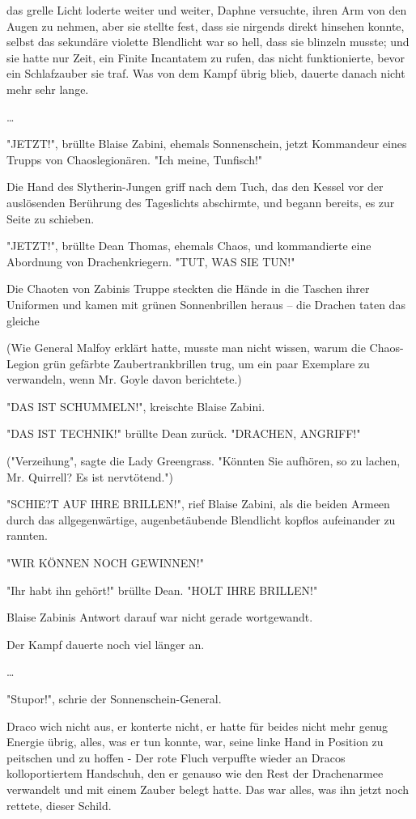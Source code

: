 {das grelle Licht loderte weiter und weiter, Daphne versuchte, ihren Arm von den Augen zu nehmen, aber sie stellte fest, dass sie nirgends direkt hinsehen konnte, selbst das sekundäre violette Blendlicht war so hell, dass sie blinzeln musste; und sie hatte nur Zeit, ein Finite Incantatem zu rufen, das nicht funktionierte, bevor ein Schlafzauber sie traf. Was von dem Kampf übrig blieb, dauerte danach nicht mehr sehr lange.

…

"JETZT!", brüllte Blaise Zabini, ehemals Sonnenschein, jetzt Kommandeur eines Trupps von Chaoslegionären. "Ich meine, Tunfisch!"

Die Hand des Slytherin-Jungen griff nach dem Tuch, das den Kessel vor der auslösenden Berührung des Tageslichts abschirmte, und begann bereits, es zur Seite zu schieben.

"JETZT!", brüllte Dean Thomas, ehemals Chaos, und kommandierte eine Abordnung von Drachenkriegern. "TUT, WAS SIE TUN!"

Die Chaoten von Zabinis Truppe steckten die Hände in die Taschen ihrer Uniformen und kamen mit grünen Sonnenbrillen heraus -- die Drachen taten das gleiche

(Wie General Malfoy erklärt hatte, musste man nicht wissen, warum die Chaos-Legion grün gefärbte Zaubertrankbrillen trug, um ein paar Exemplare zu verwandeln, wenn Mr. Goyle davon berichtete.)

"DAS IST SCHUMMELN!", kreischte Blaise Zabini.

"DAS IST TECHNIK!" brüllte Dean zurück. "DRACHEN, ANGRIFF!"

("Verzeihung", sagte die Lady Greengrass. "Könnten Sie aufhören, so zu lachen, Mr. Quirrell? Es ist nervtötend.")

"SCHIE?T AUF IHRE BRILLEN!", rief Blaise Zabini, als die beiden Armeen durch das allgegenwärtige, augenbetäubende Blendlicht kopflos aufeinander zu rannten.

"WIR KÖNNEN NOCH GEWINNEN!"

"Ihr habt ihn gehört!" brüllte Dean. "HOLT IHRE BRILLEN!"

Blaise Zabinis Antwort darauf war nicht gerade wortgewandt.

Der Kampf dauerte noch viel länger an.

…

"Stupor!", schrie der Sonnenschein-General.

Draco wich nicht aus, er konterte nicht, er hatte für beides nicht mehr genug Energie übrig, alles, was er tun konnte, war, seine linke Hand in Position zu peitschen und zu hoffen - Der rote Fluch verpuffte wieder an Dracos kolloportiertem Handschuh, den er genauso wie den Rest der Drachenarmee verwandelt und mit einem Zauber belegt hatte. Das war alles, was ihn jetzt noch rettete, dieser Schild.

}
